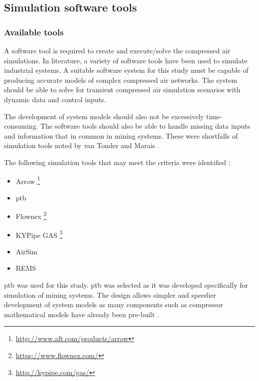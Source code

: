 \subsection{Simulation software tools}
\subsubsection{Available tools}
A software tool is required to create and execute/solve the compressed air simulations. In literature, a variety of software tools have been used to simulate industrial systems. A suitable software system for this study must be capable of producing accurate models of complex compressed air networks. The system should be able to solve for transient compressed air simulation scenarios with dynamic data and control inputs.
\par 
The development of system models should also not be excessively time-consuming. The software tools should also be able to handle missing data inputs and information that in common in mining systems. These were shortfalls of simulation tools noted by van Tonder \cite{vanTonder2014PhD} and Marais \cite{Mare2016PhD}.
\par
The following simulation tools that may meet the criteria were identified : 
\begin{itemize}
	\item Arrow \footnote{\url{http://www.aft.com/products/arrow}}
	\item \gls{ptb}
	\item Flownex \footnote{\url{https://www.flownex.com/}}
	\item KYPipe GAS \footnote{\url{http://kypipe.com/gas/}}
	\item AirSim
	\item REMS
\end{itemize}
 \gls{ptb} was used for this study. \gls{ptb} was selected as it was developed specifically for simulation of mining systems. The design allows simpler and speedier development of system models as many components such as compressor mathematical models have already been pre-built \cite{Mare2016PhD}. 
